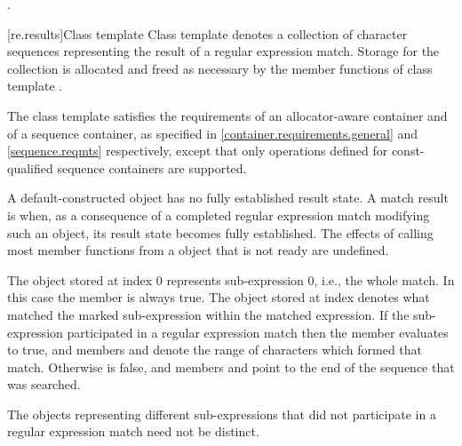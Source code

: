 \begin{itemdescr}
\pnum\returns {}.
\end{itemdescr}

[re.results]{Class template }
\pnum
{}%
Class template  denotes a collection of character
sequences representing the result of a regular expression
match. Storage for the collection is allocated and freed as necessary
by the member functions of class template .

\pnum
{}%
%
%
The class template  satisfies the requirements of an
allocator-aware container and of a sequence container, as specified
in \ref{container.requirements.general} and \ref{sequence.reqmts} respectively,
except that only operations defined for const-qualified
sequence containers are supported.

\pnum
A default-constructed  object has no fully established result state. A
match result is  when, as a consequence of a completed regular expression match
modifying such an object, its result state becomes fully established. The effects of calling
most member functions from a  object that is not ready are undefined.

\pnum
{}%
The  object stored at index 0 represents sub-expression 0,
i.e., the whole match. In this case the  member
 is always true. The 
object stored at index  denotes what matched the marked
sub-expression  within the matched expression. If the
sub-expression  participated in a regular expression 
match then the  member  evaluates to true, and
members  and  denote the range of characters
 which formed that
match. Otherwise  is false, and members 
and  point to the end of the sequence 
that was searched. \begin{note} The  objects representing
different sub-expressions that did not participate in a regular expression
match need not be distinct.\end{note}


